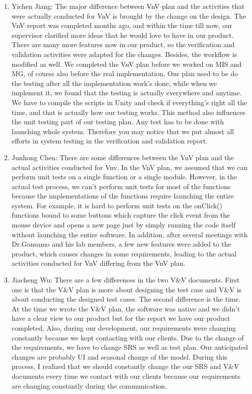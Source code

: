 \documentclass[12pt, titlepage]{article}
\begin{document}
\begin{enumerate}
  \item Yichen Jiang: The major difference between VnV plan and the activities that were actually conducted for VnV is brought by the change on the design. The VnV report was completed months ago, and within the time till now, our supervisor clarified more ideas that he would love to have in our product. There are many more features now in our product, so the verification and validation activities were adapted for the changes. Besides, the workflow is modified as well. We completed the VnV plan before we worked on MIS and MG, of course also before the real implementation. Our plan used to be do the testing after all the implementation work's done, while when we implement it, we found that the testing is actually everywhere and anytime. We have to compile the scripts in Unity and check if everything's right all the time, and that is actually how our testing works. This method also influences the unit testing part of our testing plan. Any test has to be done with launching whole system. Therefore you may notice that we put almost all efforts in system testing in the verification and validation report. 
    \item Junhong Chen: There are some differences between the VnV plan and the actual activities conducted for Vnv. In the VnV plan, we assumed that we can perform unit tests on a single function or a single module. However, in the actual test process, we can't perform unit tests for most of the functions because the implementations of the functions require launching the entire system. For example, it is hard to perform unit tests on the onClick() functions bound to some buttons which capture the click event from the mouse device and opens a new page just by simply running the code itself without launching the entire software. In addition, after several meetings with Dr.Gonsamo and his lab members, a few new features were added to the product, which causes changes in some requirements, leading to the actual activities conducted for VnV differing from the VnV plan.
    \item  Jiacheng Wu: There are a few differences in the two V\&V documents.
     First one is that the V\&V plan is more about designing the test case and V\&V is about conducting the designed test cases. The second difference is the time. At the time we wrote the V\&V plan, the software was native and we didn't have a clear view to our product but for the report we have our product completed. Also, during our development, our requirements were changing constantly because we kept contacting with our clients. Due to the change of the requirements, we have to change SRS as well as test plan. Our anticipated changes are probably UI and seasonal change of the model. During this process, I realized that we should constantly change the  our SRS and V\&V documents every time we contact with our clients because our requirements are changing constantly during the communication.


\end{enumerate}
\end{document}
